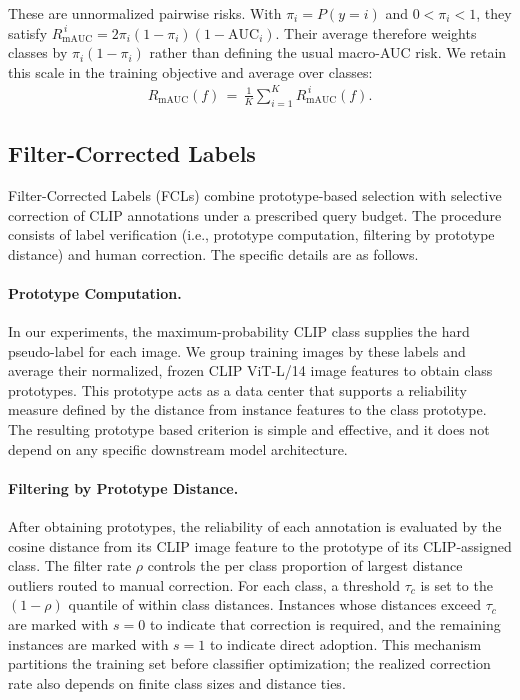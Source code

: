 \documentclass[10pt,twocolumn,letterpaper]{article}
\begin{document}
These are unnormalized pairwise risks. With $\pi_i=P(y=i)$ and $0<\pi_i<1$, they satisfy $R_{\mathrm{mAUC}}^{\,i}=2\pi_i(1-\pi_i)(1-\mathrm{AUC}_i)$. Their average therefore weights classes by $\pi_i(1-\pi_i)$ rather than defining the usual macro-AUC risk. We retain this scale in the training objective and average over classes:
\begin{equation}
\begin{aligned}
R_{\mathrm{mAUC}}(f)\,=\,\frac{1}{K}\sum_{i=1}^{K} R_{\mathrm{mAUC}}^{\,i}(f).
\end{aligned}
\end{equation}



\subsection{Filter-Corrected Labels}
Filter-Corrected Labels (FCLs) combine prototype-based selection with selective correction of CLIP annotations under a prescribed query budget. The procedure consists of label verification (i.e., prototype computation, filtering by prototype distance) and human correction. The specific details are as follows.

\paragraph{Prototype Computation.}
In our experiments, the maximum-probability CLIP class supplies the hard pseudo-label for each image. We group training images by these labels and average their normalized, frozen CLIP ViT-L/14 image features to obtain class prototypes. This prototype acts as a data center that supports a reliability measure defined by the distance from instance features to the class prototype. The resulting prototype based criterion is simple and effective, and it does not depend on any specific downstream model architecture.

\paragraph{Filtering by Prototype Distance.}
After obtaining prototypes, the reliability of each annotation is evaluated by the cosine distance from its CLIP image feature to the prototype of its CLIP-assigned class. The filter rate $\rho$ controls the per class proportion of largest distance outliers routed to manual correction. For each class, a threshold $\tau_{c}$ is set to the $(1-\rho)$ quantile of within class distances. Instances whose distances exceed $\tau_{c}$ are marked with $s=0$ to indicate that correction is required, and the remaining instances are marked with $s=1$ to indicate direct adoption. This mechanism partitions the training set before classifier optimization; the realized correction rate also depends on finite class sizes and distance ties.
\end{document}
